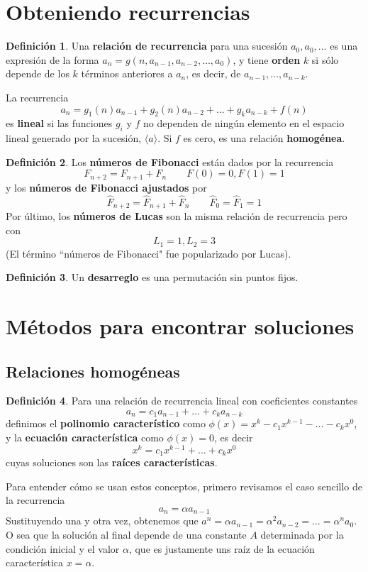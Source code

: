 \documentclass[spanish]{book}
\theoremstyle{definition}
\newtheorem*{defn}{Definición}
\begin{document}
\section{Obteniendo recurrencias}
	\begin{defn}
		Una \textbf{relación de recurrencia} para una sucesión $a_0,a_0,\ldots$ es una expresión de la forma $a_n=g(n,a_{n-1},a_{n-2},\ldots,a_0)$, y tiene \textbf{orden} $k$ si sólo depende de los $k$ términos anteriores a $a_n$, es decir, de $a_{n-1},\ldots,a_{n-k}$.
		
		La recurrencia \[a_n=g_{1}(n)a_{n-1}+g_{2}(n)a_{n-2}+\ldots+g_ka_{n-k}+f(n)\]
		es \textbf{lineal} si las funciones $g_i$ y $f$ no dependen de ningún elemento en el espacio lineal generado por la sucesión, $\langle a\rangle$. Si $f$ es cero, es una relación \textbf{homogénea}.
	\end{defn}
	\begin{defn}
		Los \textbf{números de Fibonacci} están dados por la recurrencia
		\[F_{n+2}=F_{n+1}+F_n\qquad F(0)=0,F(1)=1\]
		y los \textbf{números de Fibonacci ajustados} por
		\[\hat{F}_{n+2}=\hat{F}_{n+1}+\hat{F}_n\qquad \hat{F}_0=\hat{F}_1=1\]
		Por último, los \textbf{números de Lucas} son la misma relación de recurrencia pero con
		\[L_1=1,L_2=3\]
		(El término ``números de Fibonacci" fue popularizado por Lucas).
		
	\end{defn}
	\begin{defn}
		Un \textbf{desarreglo} es una permutación sin puntos fijos.
	\end{defn}
\section{Métodos para encontrar soluciones}
\subsection{Relaciones homogéneas}
	\begin{defn}
		Para una relación de recurrencia lineal con coeficientes constantes
		\begin{equation}\label{ec:2.2.1}
			a_n=c_1a_{n-1}+\ldots+c_ka_{n-k}
		\end{equation}
		definimos el \textbf{polinomio característico} como $\phi(x)=x^k-c_1x^{k-1}-\ldots-c_kx^{0}$, y la \textbf{ecuación característica} como $\phi(x)=0$, es decir
		\[x^k=c_1x^{k-1}+\ldots+c_kx^{0}\]
		 cuyas soluciones son las \textbf{raíces características}.
	\end{defn}
	Para entender cómo se usan estos conceptos, primero revisamos el caso sencillo de la recurrencia
	\[a_n=\alpha a_{n-1}\]
	Sustituyendo una y otra vez, obtenemos que $a^n=\alpha a_{n-1}=\alpha^2a_{n-2}=\ldots=\alpha^na_0$. O sea que la solución al final depende de una constante $A$ determinada por la condición inicial y el valor $\alpha$, que es justamente uns raíz de la ecuación característica $x=\alpha$.
	
\end{document}
